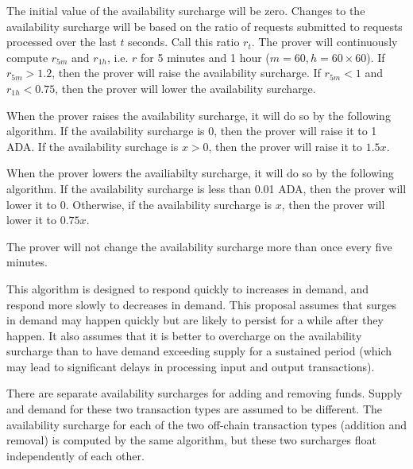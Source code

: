 \documentclass[12pt]{article}
\begin{document}
The initial value of the availability surcharge will be zero. Changes to the availability surcharge will be based on the ratio of requests submitted to requests processed over the last $t$ seconds. Call this ratio $r_t$. The prover will continuously compute $r_{5m}$ and $r_{1h}$, i.e. $r$ for 5 minutes and 1 hour ($m = 60, h = 60 \times 60$). If $r_{5m} > 1.2$, then the prover will raise the availability surcharge. If $r_{5m} < 1$ and $r_{1h} < 0.75$, then the prover will lower the availability surcharge.

When the prover raises the availability surcharge, it will do so by the following algorithm. If the availability surcharge is 0, then the prover will raise it to 1 ADA. If the availability surchage is $x > 0$, then the prover will raise it to $1.5x$.

When the prover lowers the availiabilty surcharge, it will do so by the following algorithm. If the availability surcharge is less than 0.01 ADA, then the prover will lower it to 0. Otherwise, if the availability surcharge is $x$, then the prover will lower it to $0.75x$.

The prover will not change the availability surcharge more than once every five minutes.

This algorithm is designed to respond quickly to increases in demand, and respond more slowly to decreases in demand. This proposal assumes that surges in demand may happen quickly but are likely to persist for a while after they happen. It also assumes that it is better to overcharge on the availability surcharge than to have demand exceeding supply for a sustained period (which may lead to significant delays in processing input and output transactions).

There are separate availability surcharges for adding and removing funds. Supply and demand for these two transaction types are assumed to be different. The availability surcharge for each of the two off-chain transaction types (addition and removal) is computed by the same algorithm, but these two surcharges float independently of each other.
\end{document}
